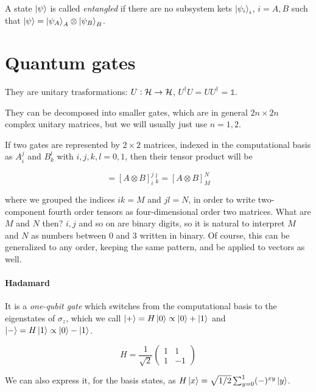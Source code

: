 \documentclass[main.tex]{subfiles}
\begin{document}
A state \(\ket{\psi } \) is called \emph{entangled} if there are no subsystem kets \(\ket{\psi _i} _i\), \(i = A, B\) such that \(\ket{\psi } = \ket{\psi _A} _A \otimes \ket{\psi _B} _B\).

\section{Quantum gates}
They are unitary trasformations: \(U: \mathcal{H} \rightarrow \mathcal{H}\), \(U ^\dag U = UU^\dag= \mathbb{1}\).

They can be decomposed into smaller gates, which are in general \(2n \times 2n\) complex unitary matrices, but we will usually just use \(n=1, 2\).

If two gates are represented by \(2 \times 2\) matrices, indexed in the computational basis as \(A_i ^j\) and \(B_k^l\) with \(i, j, k, l = 0,1\),  then their tensor product will be

\begin{equation}
    [A_i^j B_k^l] = [A \otimes B]_i^j\,_k^l = [A \otimes B ] _M ^N
\end{equation}

where we grouped the indices \(ik = M\) and \(jl=N\), in order to write two-component fourth order tensors as four-dimensional order two matrices. What are \(M\) and \(N\)  then? \(i, j\) and so on are binary digits, so it is natural to interpret \(M\) and \(N\) as numbers between \(0\) and \(3\) written in binary.
Of course, this can be generalized to any order, keeping the same pattern, and be applied to vectors as well.

\paragraph{Hadamard} \label{par:hadamard}
It is a \emph{one-qubit gate} which switches from the computational basis to the eigenstates of \(\sigma_z\), which we call \(\ket{+} = H \ket{0} \propto \ket{0} +\ket{1}   \) and \(\ket{-} = H \ket{1} \propto \ket{0} - \ket{1} \).

\begin{equation}
    H = \frac{1}{\sqrt{2} } \begin{pmatrix}
    1   & 1 \\
    1   & -1
    \end{pmatrix}
\end{equation}

We can also express it, for the basis states, as \(H \ket{x} = \sqrt{1/2} \sum _{y=0}^1 (-)^{xy} \ket{y}  \).
\end{document}
